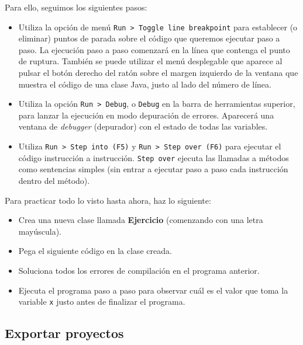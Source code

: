 \documentclass[
  spanish,
  11pt,
  a4paper,
  DIV=11,
  numbers=noendperiod]{scrartcl}
\providecommand{\tightlist}{%
  \setlength{\itemsep}{0pt}\setlength{\parskip}{0pt}}
\begin{document}
Para ello, seguimos los siguientes pasos:

\begin{itemize}
\tightlist
\item
 Utiliza la opción de menú \texttt{Run\ \textgreater{}\ Toggle\ line\ breakpoint} para establecer (o eliminar) puntos de parada sobre el código que queremos ejecutar paso a paso. La ejecución paso a paso comenzará en la línea que contenga el punto de ruptura. También se puede utilizar el menú desplegable que aparece al pulsar el botón derecho del ratón sobre el margen izquierdo de la ventana que muestra el código de una clase Java, justo al lado del número de línea.
\item
 Utiliza la opción \texttt{Run\ \textgreater{}\ Debug}, o \texttt{Debug} en la barra de herramientas superior, para lanzar la ejecución en modo depuración de errores. Aparecerá una ventana de \emph{debugger} (depurador) con el estado de todas las variables.
\item
 Utiliza \texttt{Run\ \textgreater{}\ Step\ into\ (F5)} y \texttt{Run\ \textgreater{}\ Step\ over\ (F6)} para ejecutar el código instrucción a instrucción. \texttt{Step\ over} ejecuta las llamadas a métodos como sentencias simples (sin entrar a ejecutar paso a paso cada instrucción dentro del método).
\end{itemize}

Para practicar todo lo visto hasta ahora, haz lo siguiente:

\begin{itemize}
\tightlist
\item
 Crea una nueva clase llamada \textbf{Ejercicio} (comenzando con una letra mayúscula).
\item
 Pega el siguiente código en la clase creada.
\end{itemize}


\begin{itemize}
\tightlist
\item
 Soluciona todos los errores de compilación en el programa anterior.
\item
 Ejecuta el programa paso a paso para observar cuál es el valor que toma la variable \texttt{x} justo antes de finalizar el programa.
\end{itemize}

\subsection{Exportar proyectos}\label{exportar-proyectos}
\end{document}
